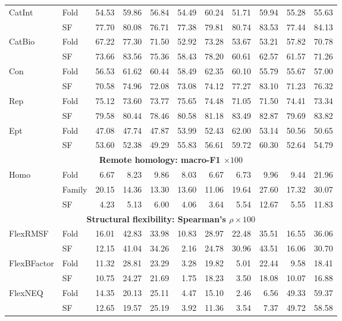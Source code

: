 \documentclass{article}
\begin{document}
\begin{minipage}{\linewidth}
\begin{tabular*}{\linewidth}{@{\extracolsep{\fill}}ll*{7}{r}@{\hspace{2pt}\vrule width 0.45pt\hspace{2pt}}*{2}{r}@{}}
\multirow{2}{*}{CatInt} & Fold & 54.53 & 59.86 & 56.84 & 54.49 & 60.24 & 51.71 & 59.94 & 55.28 & 55.63 \\
 & SF   & 77.70 & 80.08 & 76.71 & 77.38 & 79.81 & 80.74 & 83.53 & 77.44 & 84.13 \\
\multirow{2}{*}{CatBio} & Fold & 67.22 & 77.30 & 71.50 & 52.92 & 73.28 & 53.67 & 53.21 & 57.82 & 70.78 \\
 & SF   & 73.66 & 83.56 & 75.36 & 58.43 & 78.20 & 60.61 & 62.57 & 61.57 & 71.26 \\
\multirow{2}{*}{Con} & Fold & 56.53 & 61.62 & 60.44 & 58.49 & 62.35 & 60.10 & 55.79 & 55.67 & 57.00 \\
 & SF   & 70.58 & 74.96 & 72.08 & 73.08 & 74.12 & 77.27 & 83.10 & 71.23 & 76.32 \\
\multirow{2}{*}{Rep} & Fold & 75.12 & 73.60 & 73.77 & 75.65 & 74.48 & 71.05 & 71.50 & 74.41 & 73.34 \\
 & SF   & 79.58 & 80.44 & 78.46 & 80.58 & 81.18 & 83.49 & 82.87 & 79.69 & 83.82 \\
\multirow{2}{*}{Ept} & Fold & 47.08 & 47.74 & 47.87 & 53.99 & 52.43 & 62.00 & 53.14 & 50.56 & 50.65 \\
 & SF   & 53.60 & 52.38 & 49.29 & 55.83 & 56.61 & 59.72 & 60.30 & 52.64 & 54.79 \\
\midrule
\multicolumn{11}{c}{\textbf{Remote homology: macro-F1 $\times 100$}} \\
\midrule
\multirow{3}{*}{Homo} & Fold   & 6.67 & 8.23 & 9.86 & 8.03 & 6.67 & 6.73 & 9.96 & 9.44 & 21.96 \\
 & Family & 20.15 & 14.36 & 13.30 & 13.60 & 11.06 & 19.64 & 27.60 & 17.32 & 30.07 \\
 & SF     & 4.23 & 5.13 & 6.00 & 4.06 & 3.64 & 5.54 & 12.67 & 5.55 & 11.83 \\
\midrule
\multicolumn{11}{c}{\textbf{Structural flexibility: Spearman's $\rho \times 100$}} \\
\midrule
\multirow{2}{*}{FlexRMSF} & Fold & 16.01 & 42.83 & 33.98 & 10.83 & 28.97 & 22.48 & 35.51 & 16.55 & 36.06 \\
 & SF   & 12.15 & 41.04 & 34.26 & 2.16 & 24.78 & 30.96 & 43.51 & 16.06 & 30.70 \\
\multirow{2}{*}{FlexBFactor} & Fold & 11.32 & 28.81 & 23.29 & 3.28 & 19.82 & 5.01 & 22.44 & 9.58 & 18.41 \\
 & SF   & 10.75 & 24.27 & 21.69 & 1.75 & 18.23 & 3.50 & 18.08 & 10.07 & 16.88 \\
\multirow{2}{*}{FlexNEQ} & Fold & 14.35 & 20.13 & 25.11 & 4.47 & 15.10 & 2.46 & 6.56 & 49.33 & 59.37 \\
 & SF   & 12.65 & 19.57 & 25.19 & 3.92 & 11.36 & 3.54 & 7.37 & 49.72 & 58.58 \\
\bottomrule
\end{tabular*}


\end{minipage}
\end{document}
